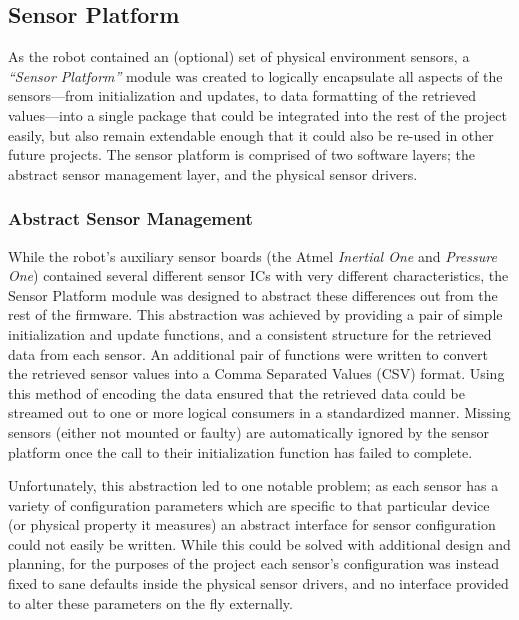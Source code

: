 \FloatBarrier
\subsection{Sensor Platform}

As the robot contained an (optional) set of physical environment sensors, a \textit{``Sensor Platform''} module was created to logically encapsulate all aspects of the sensors---from initialization and updates, to data formatting of the retrieved values---into a single package that could be integrated into the rest of the project easily, but also remain extendable enough that it could also be re-used in other future projects. The sensor platform is comprised of two software layers; the abstract sensor management layer, and the physical sensor drivers.

\FloatBarrier
\subsubsection{Abstract Sensor Management}

While the robot's auxiliary sensor boards (the Atmel \textit{Inertial One} and \textit{Pressure One}) contained several different sensor ICs with very different characteristics, the Sensor Platform module was designed to abstract these differences out from the rest of the firmware. This abstraction was achieved by providing a pair of simple initialization and update functions, and a consistent structure for the retrieved data from each sensor. An additional pair of functions were written to convert the retrieved sensor values into a Comma Separated Values (CSV) format. Using this method of encoding the data ensured that the retrieved data could be streamed out to one or more logical consumers in a standardized manner. Missing sensors (either not mounted or faulty) are automatically ignored by the sensor platform once the call to their initialization function has failed to complete.

Unfortunately, this abstraction led to one notable problem; as each sensor has a variety of configuration parameters which are specific to that particular device (or physical property it measures) an abstract interface for sensor configuration could not easily be written. While this could be solved with additional design and planning, for the purposes of the project each sensor's configuration was instead fixed to sane defaults inside the physical sensor drivers, and no interface provided to alter these parameters on the fly externally.

